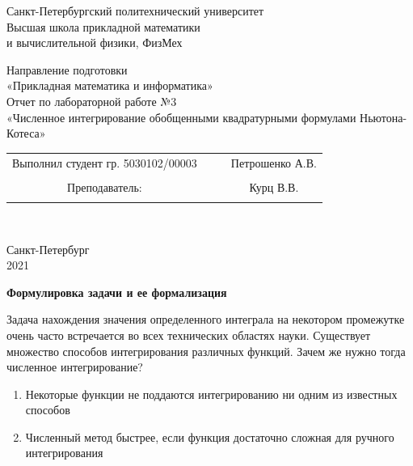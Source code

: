 \documentclass{article}
\begin{document}
	\begin{center}
		\hfill \break
		\begin{center}
			\huge{Санкт-Петербургский политехнический университет\\
				Высшая школа прикладной математики\\
				и вычислительной физики, ФизМех}
		\end{center}
		\hfill \break
		\hfill \break
		\hfill \break
		\hfill \break
		\hfill \break
		\huge{Направление подготовки\\
			«Прикладная математика и информатика»}\\
		\hfill \break
		\hfill \break
		\hfill \break
		\hfill \break
		\hfill \break
		\hfill \break
		\fontsize{14pt}{14pt}\selectfont
		Отчет по лабораторной работе №3\\
		«Численное интегрирование обобщенными квадратурными формулами Ньютона-Котеса»\\
		\hfill \break
		\hfill \break
		\hfill \break
		\hfill \break
		\hfill \break
	\end{center}
	\hfill \break
	\hfill \break
	\fontsize{12pt}{12pt}\selectfont
	\begin{tabular}{cccc}
		\hspace{1cm}Выполнил студент гр. 5030102/00003 & {\hspace{3cm}} & & Петрошенко А.В. \\\\
		\hspace{-3cm}Преподаватель: &{\hspace{1cm}}& & {\hspace{1cm}} Курц В.В. \\\\
	\end{tabular}\\
	\hfill \break
	\hfill \break
	\hfill \break
	\hfill \break
	\hfill \break
	\hfill \break
	\begin{center} Санкт-Петербург\\ 
		2021\\
	\end{center}
	\thispagestyle{empty}
	\newpage
	\begin{center} \textbf{Формулировка задачи и ее формализация}\end{center}
	Задача нахождения значения определенного интеграла на некотором промежутке очень часто встречается во всех технических областях науки. Существует множество способов интегрирования различных функций. Зачем же нужно тогда численное интегрирование?
	\begin{enumerate}
		\item Некоторые функции не поддаются интегрированию ни одним из известных способов
		\item Численный метод быстрее, если функция достаточно сложная для ручного интегрирования
	\end{enumerate}
\end{document}

